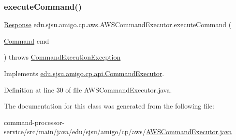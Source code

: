 \subsubsection{\texorpdfstring{execute\+Command()}{executeCommand()}}
{\footnotesize\ttfamily \hyperlink{classedu_1_1sjsu_1_1amigo_1_1cp_1_1api_1_1_response}{Response} edu.\+sjsu.\+amigo.\+cp.\+aws.\+A\+W\+S\+Command\+Executor.\+execute\+Command (\begin{DoxyParamCaption}\item[{\hyperlink{classedu_1_1sjsu_1_1amigo_1_1cp_1_1api_1_1_command}{Command}}]{cmd }\end{DoxyParamCaption}) throws \hyperlink{classedu_1_1sjsu_1_1amigo_1_1cp_1_1api_1_1_command_execution_exception}{Command\+Execution\+Exception}}



Implements \hyperlink{interfaceedu_1_1sjsu_1_1amigo_1_1cp_1_1api_1_1_command_executor_af1e217a4347a1f1e8e2d0d465b94a662}{edu.\+sjsu.\+amigo.\+cp.\+api.\+Command\+Executor}.



Definition at line 30 of file A\+W\+S\+Command\+Executor.\+java.



The documentation for this class was generated from the following file\+:\begin{DoxyCompactItemize}
\item 
command-\/processor-\/service/src/main/java/edu/sjsu/amigo/cp/aws/\hyperlink{_a_w_s_command_executor_8java}{A\+W\+S\+Command\+Executor.\+java}\end{DoxyCompactItemize}
